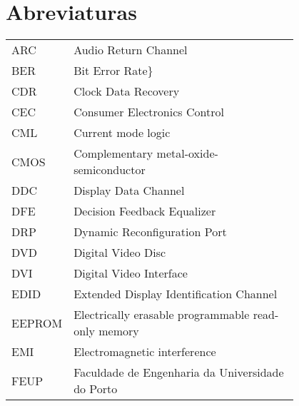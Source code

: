 \chapter*{Abreviaturas}

\begin{flushleft}
\begin{longtable}{l p{0.8\linewidth}}
ARC       & Audio Return Channel                                                                         \\
BER       & Bit Error Rate\}                                                                             \\
CDR       & Clock Data Recovery                                                                          \\
CEC       & Consumer Electronics Control                                                                 \\
CML       & Current mode logic                                                                           \\
CMOS      & Complementary metal-oxide-semiconductor                                                      \\
DDC       & Display Data Channel                                                                         \\
DFE       & Decision Feedback Equalizer                                                                  \\
DRP       & Dynamic Reconfiguration Port                                                                 \\
DVD       & Digital Video Disc                                                                           \\
DVI       & Digital Video Interface                                                                      \\
EDID      & Extended Display Identification Channel                                                      \\
EEPROM    & Electrically erasable programmable read-only memory                                          \\
EMI       & Electromagnetic interference                                                                 \\
FEUP      & Faculdade de Engenharia da Universidade do Porto                                             \\

\end{longtable}
\end{flushleft}
